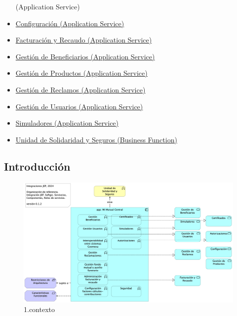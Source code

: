 \documentclass[
  paper=a4,
  ,captions=tableheading
]{scrartcl}
\begin{document}
\begin{itemize}
{  (Application Service)}
\item
  \protect\hyperlink{configuraciuxf3n-application-service}{Configuración
  (Application Service)}
\item
  \protect\hyperlink{facturaciuxf3n-y-recaudo-application-service}{Facturación
  y Recaudo (Application Service)}
\item
  \protect\hyperlink{gestiuxf3n-de-beneficiarios-application-service}{Gestión
  de Beneficiarios (Application Service)}
\item
  \protect\hyperlink{gestiuxf3n-de-productos-application-service}{Gestión
  de Productos (Application Service)}
\item
  \protect\hyperlink{gestiuxf3n-de-reclamos-application-service}{Gestión
  de Reclamos (Application Service)}
\item
  \protect\hyperlink{gestiuxf3n-de-usuarios-application-service}{Gestión
  de Usuarios (Application Service)}
\item
  \protect\hyperlink{simuladores-application-service}{Simuladores
  (Application Service)}
\item
  \protect\hyperlink{unidad-de-solidaridad-y-seguros-business-function}{Unidad
  de Solidaridad y Seguros (Business Function)}
\end{itemize}

\hypertarget{introducciuxf3n}{%
\subsection{Introducción}\label{introducciuxf3n}}

\begin{figure}
\centering
\includegraphics{01.prop.contexto.png}
\caption{1.contexto}
\end{figure}
\end{document}
